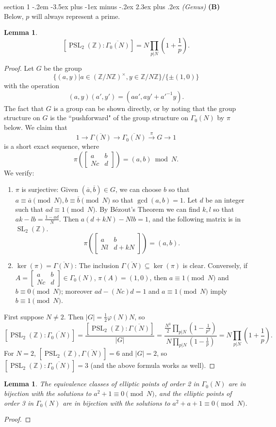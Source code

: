 \documentclass[12pt]{article}
\makeatletter
\theoremstyle{norm}
\newtheorem{lem}[thm]{Lemma}
\newcommand{\Z}[0]{\mathbb{Z}}
\newcommand{\rc}[1]{\frac{1}{#1}}
\newcommand{\subeq}[0]{\subseteq}
\newcommand{\Ga}[0]{\Gamma}
\newcommand{\ph}[0]{\varphi}
\newcommand{\pa}[1]{\left( {#1} \right)}
\newcommand{\xr}[1]{\xrightarrow{#1}}
\newcommand{\subprob}[1]{\noindent\textbf{#1}\\}
\newcommand{\PSL}{\operatorname{PSL}}
\newcommand{\SL}{\operatorname{SL}}
\newcommand{\ol}[1]{\overline{#1}}
\newcommand{\matt}[4]{
\left[
\begin{matrix}
{#1}&{#2}\\
{#3}&{#4}
\end{matrix}
\right]}
\newenvironment{problem}{\@startsection
       {section}
       {1}
       {-.2em}
       {-3.5ex plus -1ex minus -.2ex}
       {2.3ex plus .2ex}
       {\pagebreak[3]%
       \large\bf\noindent{Problem }
       }
       }
       {%
       }
\makeatother
\begin{document}
\begin{problem}{\it (Genus)}
\subprob{(B)}
Below, $p$ will always represent a prime.
\begin{lem}
\[
[\PSL_2(\Z):\overline{\Ga_0(N)}]=N\prod_{p|N}\pa{1+\rc p}.
\]
\end{lem}
\begin{proof}
Let $G$ be the group
\[
\{
(a,y)|a\in (\Z/N\Z)^{\times},y\in \Z/N\Z
\}/\{\pm(1,0)\}
\]
with the operation
\[
(a,y)(a',y')=(aa',ay'+a'^{-1}y).
\]
The fact that $G$ is a group can be shown directly, or by noting that the group structure on $G$ is the ``pushforward" of the group structure on $\Ga_0(N)$ by $\pi$ below.
We claim that
\[
1\to \overline{\Ga(N)}\to \overline{\Ga_0(N)} \xr{\pi}G\to 1
\]
is a short exact sequence, where 
\[
\pi\pa{\matt ab{Nc}d}=(a,b)\bmod N.
\]
We verify:
\begin{enumerate}
\item
$\pi$ is surjective: Given $(\ol{a},\ol{b})\in G$, we can choose $b$ so that $a\equiv \ol{a}\pmod N,b\equiv \ol{b}\pmod N$ so that $\gcd(a,b)=1$.
Let $d$ be an integer such that $ad\equiv 1\pmod N$. By B\'ezout's Theorem we can find $k,l$ so that $ak-lb=\frac{1-ad}{N}$. Then $a(d+kN)-Nlb=1$, and the following  matrix is in $\SL_2(\Z)$.
\[
\pi\pa{\matt ab{Nl}{d+kN}}=(a,b).
\]
\item
$\ker(\pi)=\overline{\Ga(N)}$: The inclusion $\overline{\Ga(N)}\subeq \ker (\pi)$ is clear.
Conversely, if $A=\matt ab{Nc}d\in \Ga_0(N)$, $\pi(A)=(1,0)$, then $a\equiv 1\pmod N$ and $b\equiv 0\pmod N$; moreover $ad-(Nc)d=1$ and $a\equiv 1\pmod N$ imply $b\equiv 1 \pmod N$. 
\end{enumerate}
First suppose $N\neq 2$.
Then $|G|=\rc{2}\ph(N)N$, so
\[
[\PSL_2(\Z):\ol{\Ga_0(N)}]=\frac{[\PSL_2(\Z):\ol{\Ga(N)}]}{|G|}=\frac{\frac{N^3}{2}\prod_{p|N}\pa{1-\rc{p^2}}}{N\prod_{p|N}\pa{1-\rc p}}=N\prod_{p|N}\pa{1+\rc p}.
\]
For $N=2$, $[\PSL_2(\Z),\ol{\Ga(N)}]=6$ and $|G|=2$, so $[\PSL_2(\Z):\ol{\Ga_0(N)}]=3$ (and the above formula works as well).
\end{proof}
\begin{lem}
The equivalence classes of elliptic points of order 2 in $\Ga_0(N)$ are in bijection with the solutions to $a^2+1\equiv 0\pmod N$, and the elliptic points of order 3 in $\Ga_0(N)$ are in bijection with the solutions to $a^2+a+1\equiv 0\pmod N$.
\end{lem}
\begin{proof}

\end{proof}
\end{problem}
\end{document}
